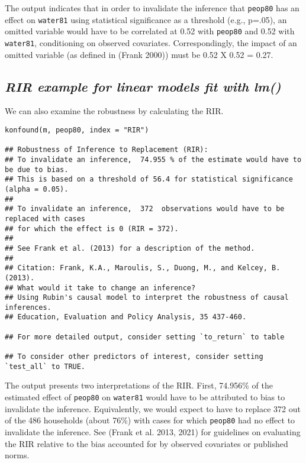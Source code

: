\documentclass[
]{article}
\begin{document}
The output indicates that in order to invalidate the inference that
\texttt{peop80} has an effect on \texttt{water81} using statistical
significance as a threshold (e.g., p=.05), an omitted variable would
have to be correlated at 0.52 with \texttt{peop80} and 0.52 with
\texttt{water81}, conditioning on observed covariates. Correspondingly,
the impact of an omitted variable (as defined in (Frank 2000)) must be
0.52 X 0.52 = 0.27.

\hypertarget{rir-example-for-linear-models-fit-with-lm}{%
\subsection{\texorpdfstring{\emph{RIR example for linear models fit with
lm()}}{RIR example for linear models fit with lm()}}\label{rir-example-for-linear-models-fit-with-lm}}

We can also examine the robustness by calculating the RIR.

\begin{verbatim}
konfound(m, peop80, index = "RIR") 

## Robustness of Inference to Replacement (RIR):
## To invalidate an inference,  74.955 % of the estimate would have to be due to bias. 
## This is based on a threshold of 56.4 for statistical significance (alpha = 0.05).
## 
## To invalidate an inference,  372  observations would have to be replaced with cases
## for which the effect is 0 (RIR = 372).
## 
## See Frank et al. (2013) for a description of the method.
## 
## Citation: Frank, K.A., Maroulis, S., Duong, M., and Kelcey, B. (2013).
## What would it take to change an inference?
## Using Rubin's causal model to interpret the robustness of causal inferences.
## Education, Evaluation and Policy Analysis, 35 437-460.

## For more detailed output, consider setting `to_return` to table

## To consider other predictors of interest, consider setting `test_all` to TRUE.
\end{verbatim}

The output presents two interpretations of the RIR. First, 74.956\% of
the estimated effect of \texttt{peop80} on \texttt{water81} would have
to be attributed to bias to invalidate the inference. Equivalently, we
would expect to have to replace 372 out of the 486 households (about
76\%) with cases for which \texttt{peop80} had no effect to invalidate
the inference. See (Frank et al. 2013, 2021) for guidelines on
evaluating the RIR relative to the bias accounted for by observed
covariates or published norms.
\end{document}
